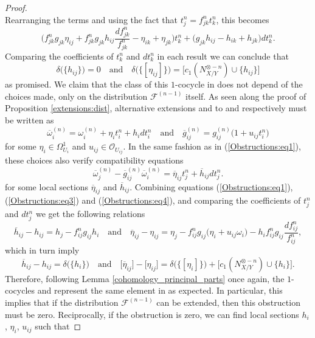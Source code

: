 \documentclass[reqno]{amsart}
\theoremstyle{plain}
\newcommand{\OO}{\mathcal{O}}
\newcommand{\F}{\mathscr{F}}
\newcommand{\PP}{\mathcal{P}}
\theoremstyle{definition}
\theoremstyle{named}
\begin{document}
\begin{proof}
\[\]
Rearranging the terms and using the fact that $t_j^n=f_{jk}^nt_k^n$, this becomes
\[
\Bigg(f_{jk}^ng_{jk}\eta_{ij}+f_{jk}^ng_{jk}h_{ij}\frac{df_{jk}^n}{f_{jk}^n}-\eta_{ik}+\eta_{jk}\Bigg) t_k^n + \Big(g_{jk}h_{ij}-h_{ik}+h_{jk}\Big) dt_k^n.
\]
Comparing the coefficients of $t_k^n$ and $dt_k^n$ in each result we can conclude that
\begin{equation*}
\delta\big(\{h_{ij}\}\big) = 0 \quad\text{and}\quad \delta\big(\{[\eta_{ij}]\}\big) = \big[c_1(N_{X/Y}^{\otimes - n})\cup \{h_{ij}\}\big]
\end{equation*} 
as promised. We claim that the class of this $1$-cocycle in \smash{$H^1\big(X,\PP_{\F,N_{X/Y}^{\otimes - n}}\big)$} does not depend of the choices made, only on the distribution $\F^{(n-1)}$ itself. As seen along the proof of Proposition \ref{extensions:dist}, alternative extensions  and  to  and  respectively must be written as
\begin{equation}\label{Obstructions:eq3}
\overline{\omega}_i^{(n)} = \omega_i^{(n)}+ \eta_it_i^n+h_idt_i^n\quad\text{and}\quad \overline{g}_{ij}^{(n)} = g_{ij}^{(n)}\big(1+u_{ij}t_i^n\big) 
\end{equation}
for some $\eta_i\in \Omega^1_{U_i}$ and $u_{ij}\in \OO_{U_{ij}}$.
In the same fashion as in (\ref{Obstructions:eq1}), these choices also verify compatibility equations
\begin{equation}\label{Obstructions:eq4}
\overline{\omega}^{(n)}_j - \overline{g}_{ij}^{(n)}\overline{\omega}_i^{(n)} = \overline{\eta}_{ij} t_j^n+ \overline{h}_{ij}dt_j^n.  
\end{equation}
for some local sections $\overline{\eta}_{ij}$ and $\overline{h}_{ij}$. Combining equations (\ref{Obstructions:eq1}), (\ref{Obstructions:eq3}) and (\ref{Obstructions:eq4}), and comparing the coefficients of $t_j^n$ and $dt_j^n$ we get the following relations 
\[
\overline{h}_{ij}-h_{ij} = h_{j}-f_{ij}^ng_{ij}h_i\quad\text{and}\quad \overline{\eta}_{ij}-\eta_{ij} = \eta_{j}-f_{ij}^ng_{ij}\big(\eta_{i}+u_{ij}\omega_i\big) -h_i f_{ij}^ng_{ij} \frac{df_{ij}^n}{f_{ij}^n},
\]
which in turn imply
\[
\overline{h}_{ij}-h_{ij} =\delta\big(\{h_{i}\}\big)\quad\text{and}\quad \big[\overline{\eta}_{ij}\big]-\big[\eta_{ij}\big]=\delta\big(\{[\eta_{i}]\}\big)+\big[c_1(N_{X/Y}^{\otimes - n})\cup \{h_{i}\}\big].
\]
Therefore, following Lemma \ref{cohomology_principal_parts} once again, the $1$-cocycles  and   represent the same element in \smash{$H^1\big(X,\PP_{\F,N_{X/Y}^{\otimes - n}}\big)$} as expected. In particular, this implies that if the distribution $\F^{(n-1)}$ can be extended, then this obstruction must be zero. Reciprocally, if the obstruction  is zero, we can find local sections $h_i$, $\eta_i$, $u_{ij}$ such that

\end{proof}
\end{document}
